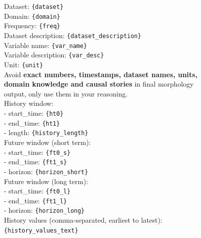 \documentclass[11pt]{article}
\begin{document}
\begin{figure}[htbp]
\begin{tcolorbox}[
  boxrule=0.25pt,
  colback=promptBgSystem,
  colframe=black,
  colbacktitle=promptBgTitle,
  coltitle=black,
  title={Prompt: User (Metadata Available)},
  fonttitle=\bfseries,
  fontupper=\small
]
Dataset: \texttt{\{dataset\}} \\
Domain: \texttt{\{domain\}} \\
Frequency: \texttt{\{freq\}} \\
Dataset description: \texttt{\{dataset\_description\}} \\

Variable name: \texttt{\{var\_name\}} \\
Variable description: \texttt{\{var\_desc\}} \\
Unit: \texttt{\{unit\}} \\
Avoid \textbf{exact numbers, timestamps, dataset names, units, domain knowledge and causal stories} in final morphology output, only use them in your reasoning. \\

History window: \\
\quad - start\_time: \texttt{\{ht0\}} \\
\quad - end\_time: \texttt{\{ht1\}} \\
\quad - length: \texttt{\{history\_length\}} \\

Future window (short term): \\
\quad - start\_time: \texttt{\{ft0\_s\}} \\
\quad - end\_time: \texttt{\{ft1\_s\}} \\
\quad - horizon: \texttt{\{horizon\_short\}} \\

Future window (long term): \\
\quad - start\_time: \texttt{\{ft0\_l\}} \\
\quad - end\_time: \texttt{\{ft1\_l\}} \\
\quad - horizon: \texttt{\{horizon\_long\}} \\

History values (comma-separated, earliest to latest): \\
\texttt{\{history\_values\_text\}}
\end{tcolorbox}
\end{figure}
\end{document}
